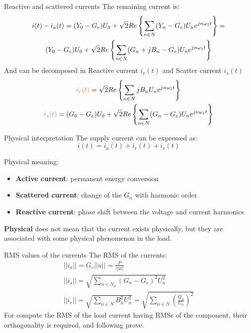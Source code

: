 \documentclass[aspectratio=169]{beamer}
\begin{document}
  \begin{frame}{Reactive and scattered currents}{\insertsection}
  The remaining current is:
  \begin{gather}
    i(t)-i_a(t) = (Y_0-G_e)U_0 + \sqrt{2}Re\left\{\sum_{n\in N}(Y_n-G_e)U_n e^{jn\omega_1t}\right\}=\notag \\
    (Y_0-G_e)U_0 + \sqrt{2}Re\left\{\sum_{n\in N}(G_n+jB_n-G_e)U_n e^{jn\omega_1t}\right\}
  \end{gather}
  And can be decomposed in \textcolor{NTNU_orange}{Reactive current} $i_r(t)$ and  \textcolor{NTNU_blue}{Scatter current} $i_s(t)$
  \begin{gather}
    \textcolor{NTNU_orange}{i_r(t)} = \sqrt{2} Re\left\{\sum_{n\in N}j B_n U_n e^{jn\omega_1t}\right\}\\
    \textcolor{NTNU_blue}{i_s(t)} = (G_0-G_e)U_0 + \sqrt{2}Re\left\{\sum_{n\in N}(G_n-G_e)U_n e^{jn\omega_1t}\right\}
  \end{gather}

  \end{frame}

  \begin{frame}{Physical interpretation}{\insertsection}
  The supply current can be expressed as:
    \begin{equation}
      i(t) = i_a(t) + i_r(t) + i_s(t)
    \end{equation}

    Physical meaning:
    \begin{itemize}
      \item \textbf{Active current}: permanent energy conversion
      \item \textbf{Scattered current}: change of the $G_n$ with harmonic order
      \item \textbf{Reactive current}: phase shift between the voltage and current harmonics
    \end{itemize}

    \textbf{\textcolor{NTNU_blue}{Physical}} does not mean that the current exists physically, but they are associated with some physical phenomenon in the load. 
  \end{frame}

  \begin{frame}{RMS values of the currents}{\insertsection}
  The RMS of the currents:
      \begin{gather}
            ||i_a||=G_e||u||=\frac{P}{||u||}\\
            ||i_s||=\sqrt{\sum_{n \in N_0}(G_n-G_e)^2U_n^2}\\
            ||i_r||=\sqrt{\sum_{n\in N}B_n^2U_n^2}=\sqrt{\sum_{n\in N}\left(\frac{Q_n}{U_n}\right)^2}
      \end{gather}
      For compute the RMS of the load current having RMSs of the component, their orthogonality is required, and following prove.
  \end{frame}
\end{document}
